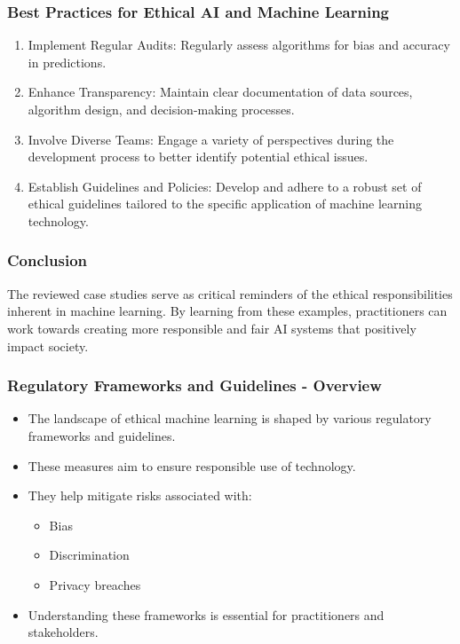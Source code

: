 \documentclass[aspectratio=169]{beamer}
\begin{document}
\begin{frame}[fragile]
    \frametitle{Best Practices for Ethical AI and Machine Learning}
    \begin{enumerate}
        \item Implement Regular Audits: Regularly assess algorithms for bias and accuracy in predictions.
        \item Enhance Transparency: Maintain clear documentation of data sources, algorithm design, and decision-making processes.
        \item Involve Diverse Teams: Engage a variety of perspectives during the development process to better identify potential ethical issues.
        \item Establish Guidelines and Policies: Develop and adhere to a robust set of ethical guidelines tailored to the specific application of machine learning technology.
    \end{enumerate}
\end{frame}

\begin{frame}[fragile]
    \frametitle{Conclusion}
    The reviewed case studies serve as critical reminders of the ethical responsibilities inherent in machine learning. 
    By learning from these examples, practitioners can work towards creating more responsible and fair AI systems that positively impact society.
\end{frame}

\begin{frame}[fragile]
    \frametitle{Regulatory Frameworks and Guidelines - Overview}
    \begin{itemize}
        \item The landscape of ethical machine learning is shaped by various regulatory frameworks and guidelines.
        \item These measures aim to ensure responsible use of technology.
        \item They help mitigate risks associated with:
        \begin{itemize}
            \item Bias
            \item Discrimination
            \item Privacy breaches
        \end{itemize}
        \item Understanding these frameworks is essential for practitioners and stakeholders.
    \end{itemize}
\end{frame}
\end{document}
